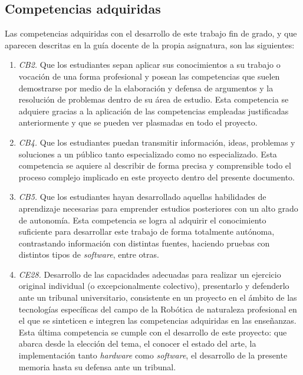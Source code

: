 \subsection{Competencias adquiridas}

Las competencias adquiridas con el desarrollo de este trabajo fin de grado, y que aparecen descritas en la guía docente de la propia asignatura, son las siguientes: 

\begin{enumerate}
	\item{\textit{CB2.} Que los estudiantes sepan aplicar sus conocimientos a su trabajo o vocación de una forma profesional y posean las competencias que suelen demostrarse por medio de la elaboración y defensa de argumentos y la resolución de problemas dentro de su área de estudio. 
	Esta competencia se adquiere gracias a la aplicación de las competencias empleadas justificadas anteriormente y que se pueden ver plasmadas en todo el proyecto.}
	\item{\textit{CB4.} Que los estudiantes puedan transmitir información, ideas, problemas y soluciones a un público tanto especializado como no especializado. 
	Esta competencia se aquiere al describir de forma precisa y comprensible todo el proceso complejo implicado en este proyecto dentro del presente documento.}
	\item{\textit{CB5.} Que los estudiantes hayan desarrollado aquellas habilidades de aprendizaje necesarias para emprender estudios posteriores con un alto grado de autonomía. 
	Esta competencia se logra al adquirir el conocimiento suficiente para desarrollar este trabajo de forma totalmente autónoma, contrastando información con distintas fuentes, haciendo pruebas con distintos tipos de \textit{software}, entre otras.}
	\item{\textit{CE28.} Desarrollo de las capacidades adecuadas para realizar un ejercicio original individual (o excepcionalmente colectivo), presentarlo y defenderlo ante un tribunal universitario, consistente en un proyecto en el ámbito de las tecnologías específicas del campo de la Robótica de naturaleza profesional en el que se sinteticen e integren las competencias adquiridas en las enseñanzas.
	Esta última competencia se cumple con el desarrollo de este proyecto: que abarca desde la elección del tema, el conocer el estado del arte, la implementación tanto \textit{hardware} como \textit{software}, el desarrollo de la presente memoria hasta su defensa ante un tribunal.}
\end{enumerate}



